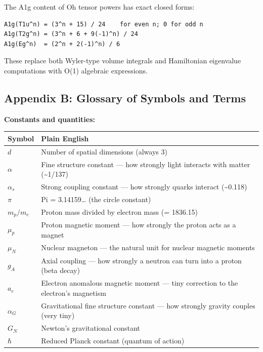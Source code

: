 \documentclass[
]{article}
\newcounter{none} %
\begin{document}
The A1g content of Oh tensor powers has exact closed forms:

\begin{verbatim}
A1g(T1u^n) = (3^n + 15) / 24    for even n; 0 for odd n
A1g(T2g^n) = (3^n + 6 + 9(-1)^n) / 24
A1g(Eg^n)  = (2^n + 2(-1)^n) / 6
\end{verbatim}

These replace both Wyler-type volume integrals and Hamiltonian
eigenvalue computations with O(1) algebraic expressions.

\subsection{Appendix B: Glossary of Symbols and
Terms}\label{appendix-b-glossary-of-symbols-and-terms}

\textbf{Constants and quantities:}

{\def\LTcaptype{none} %
\begin{longtable}[]{@{}
  >{\raggedright\arraybackslash}p{}
  >{\raggedright\arraybackslash}p{}@{}}
\toprule\noalign{}
\begin{minipage}[b]{\linewidth}\raggedright
Symbol
\end{minipage} & \begin{minipage}[b]{\linewidth}\raggedright
Plain English
\end{minipage} \\
\midrule\noalign{}
\endhead
\bottomrule\noalign{}
\endlastfoot
\(d\) & Number of spatial dimensions (always 3) \\
\(\alpha\) & Fine structure constant --- how strongly light interacts
with matter (\textasciitilde1/137) \\
\(\alpha_s\) & Strong coupling constant --- how strongly quarks interact
(\textasciitilde0.118) \\
\(\pi\) & Pi = 3.14159\ldots{} (the circle constant) \\
\(m_p / m_e\) & Proton mass divided by electron mass (= 1836.15) \\
\(\mu_p\) & Proton magnetic moment --- how strongly the proton acts as a
magnet \\
\(\mu_N\) & Nuclear magneton --- the natural unit for nuclear magnetic
moments \\
\(g_A\) & Axial coupling --- how strongly a neutron can turn into a
proton (beta decay) \\
\(a_e\) & Electron anomalous magnetic moment --- tiny correction to the
electron's magnetism \\
\(\alpha_G\) & Gravitational fine structure constant --- how strongly
gravity couples (very tiny) \\
\(G_N\) & Newton's gravitational constant \\
\(\hbar\) & Reduced Planck constant (quantum of action) \\
\end{longtable}
}
\end{document}
